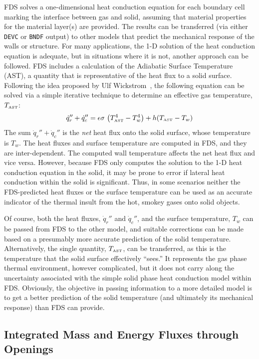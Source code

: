 \documentclass[11pt]{book}
\newcommand{\ct}{\tt\small}
\newcommand{\be}{\begin{equation}}
\newcommand{\ee}{\end{equation}}
\begin{document}
FDS solves a one-dimensional heat conduction equation for each boundary cell marking the interface
between gas and solid, assuming that material properties for the material layer(s) are provided. The results can
be transferred (via either {\ct DEVC} or {\ct BNDF} output) to other models that predict the
mechanical response of the walls or structure. For many applications, the 1-D solution of the heat conduction
equation is adequate, but in situations where it is not, another approach can be followed. FDS includes a
calculation of the Adiabatic Surface Temperature (AST), a quantity that is representative of the heat flux to a
solid surface. Following the idea proposed by Ulf Wickstrom~\cite{Wickstrom:Interflam2007}, the following equation can
be solved via a simple iterative technique to determine an effective gas temperature, $T_{\hbox{\tiny AST}}$:
\be \dot{q}_r'' + \dot{q}_c'' = \epsilon \sigma \, \left( T_{\hbox{\tiny AST}}^4 - T_w^4 \right) + h (T_{\hbox{\tiny AST}} - T_w )  \ee
The sum $\dot{q}_r'' + \dot{q}_c''$ is the {\em net} heat flux onto the solid surface, whose temperature is
$T_w$. The heat fluxes and surface temperature are computed in FDS, and they are inter-dependent. The computed wall
temperature affects the net heat flux and vice versa. However, because FDS only computes the solution to the
1-D heat conduction equation in the solid, it may be prone to error if lateral heat conduction within the solid is
significant. Thus, in some scenarios neither the FDS-predicted heat fluxes or the surface temperature can be used as
an accurate indicator of the thermal insult from the hot, smokey gases onto solid objects.

Of course, both the heat fluxes, $\dot{q}_r''$ and $\dot{q}_c''$, and the surface temperature, $T_w$ can be passed from FDS to the
other model, and suitable corrections can be made based on a presumably more accurate prediction of the solid temperature.
Alternatively, the single quantity, $T_{\hbox{\tiny AST}}$, can be transferred, as this is the temperature that the solid
surface effectively ``sees.'' It represents the gas phase thermal environment, however complicated, but it does not
carry along the uncertainty associated with the simple solid phase heat conduction model within FDS. Obviously, the
objective in passing information to a more detailed model is to get a better prediction of the solid temperature (and
ultimately its mechanical response) than FDS can provide.



\subsection{Integrated Mass and Energy Fluxes through Openings}
\label{info:flows}
\end{document}
